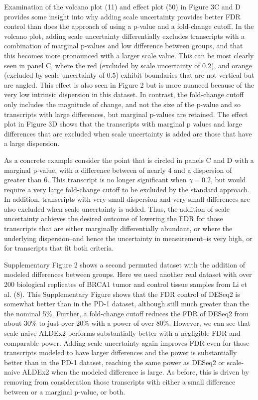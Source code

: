 \documentclass[
]{article}
\begin{document}
Examination of the volcano plot (11) and effect plot (50) in Figure 3C
and D provides some insight into why adding scale uncertainty provides
better FDR control than does the approach of using a p-value and a
fold-change cutoff. In the volcano plot, adding scale uncertainty
differentially excludes transcripts with a combination of marginal
p-values and low difference between groups, and that this becomes more
pronounced with a larger scale value. This can be most clearly seen in
panel C, where the red (excluded by scale uncertainty of 0.2), and
orange (excluded by scale uncertainty of 0.5) exhibit boundaries that
are not vertical but are angled. This effect is also seen in Figure 2
but is more nuanced because of the very low intrinsic dispersion in this
dataset. In contrast, the fold-change cutoff only includes the magnitude
of change, and not the size of the p-value and so transcripts with large
differences, but marginal p-values are retained. The effect plot in
Figure 3D shows that the transcripts with marginal p values and large
differences that are excluded when scale uncertainty is added are those
that have a large dispersion.

As a concrete example consider the point that is circled in panels C and
D with a marginal p-value, with a difference between of nearly 4 and a
dispersion of greater than 6. This transcript is no longer significant
when \(\gamma = 0.2\), but would require a very large fold-change cutoff
to be excluded by the standard approach. In addition, transcripts with
very small dispersion and very small differences are also excluded when
scale uncertainty is added. Thus, the addition of scale uncertainty
achieves the desired outcome of lowering the FDR for those transcripts
that are either marginally differentially abundant, or where the
underlying dispersion--and hence the uncertainty in measurement--is very
high, or for transcripts that fit both criteria.

Supplementary Figure 2 shows a second permuted dataset with the addition
of modeled differences between groups. Here we used another real dataset
with over 200 biological replicates of BRCA1 tumor and control tissue
samples from Li et al. (8). This Supplementary Figure shows that the FDR
control of DESeq2 is somewhat better than in the PD-1 dataset, although
still much greater than the the nominal 5\%. Further, a fold-change
cutoff reduces the FDR of DESeq2 from about 30\% to just over 20\% with
a power of over 80\%. However, we can see that scale-naive ALDEx2
performs substantially better with a negligible FDR and comparable
power. Adding scale uncertainty again improves FDR even for those
transcripts modeled to have larger differences and the power is
substantially better than in the PD-1 dataset, reaching the same power
as DESeq2 or scale-naive ALDEx2 when the modeled difference is large. As
before, this is driven by removing from consideration those transcripts
with either a small difference between or a marginal p-value, or both.
\end{document}
